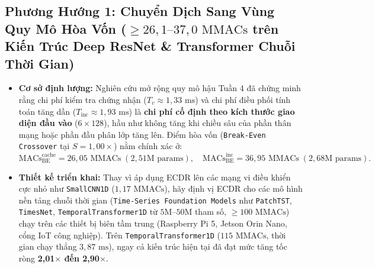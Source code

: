 \documentclass[11pt,a4paper]{article}
\newcommand{\code}[1]{{\small\ttfamily\nolinkurl{#1}}}
\begin{document}
\subsection{Phương Hướng 1: Chuyển Dịch Sang Vùng Quy Mô Hòa Vốn (\texorpdfstring{$\ge 26,1\text{--}37,0\text{ MMACs}$}{>= 26,1-37,0 MMACs} trên Kiến Trúc Deep ResNet \& Transformer Chuỗi Thời Gian)}
\begin{itemize}
  \item \textbf{Cơ sở định lượng:} Nghiên cứu mở rộng quy mô hậu Tuần 4 đã chứng minh rằng chi phí kiểm tra chứng nhận ($T_v \approx 1,33\text{ ms}$) và chi phí điều phối tính toán tăng dần ($T_{\text{inc}} \approx 1,93\text{ ms}$) là \textbf{chi phí cố định theo kích thước giao diện đầu vào} ($6 \times 128$), hầu như không tăng khi chiều sâu của phần thân mạng hoặc phần đầu phân lớp tăng lên. Điểm hòa vốn (\code{Break-Even Crossover} tại $S = 1,00\times$) nằm chính xác ở:
  \begin{equation}
    \text{MACs}_{\text{BE}}^{\text{cache}} = 26,05\text{ MMACs} \; (2,51\text{M params}), \quad
    \text{MACs}_{\text{BE}}^{\text{inc}} = 36,95\text{ MMACs} \; (2,68\text{M params}).
  \end{equation}
  \item \textbf{Thiết kế triển khai:} Thay vì áp dụng ECDR lên các mạng vi điều khiển cực nhỏ như \code{SmallCNN1D} ($1,17\text{ MMACs}$), hãy định vị ECDR cho các mô hình nền tảng chuỗi thời gian (\code{Time-Series Foundation Models} như \code{PatchTST}, \code{TimesNet}, \code{TemporalTransformer1D} từ $5\text{M}$--$50\text{M}$ tham số, $\ge 100\text{ MMACs}$) chạy trên các thiết bị biên tầm trung (Raspberry Pi 5, Jetson Orin Nano, cổng IoT công nghiệp). Trên \code{TemporalTransformer1D} ($115\text{ MMACs}$, thời gian chạy thẳng $3,87\text{ ms}$), ngay cả kiến trúc hiện tại đã đạt mức tăng tốc ròng \textbf{2,01$\times$ đến 2,90$\times$}.
\end{itemize}
\end{document}

